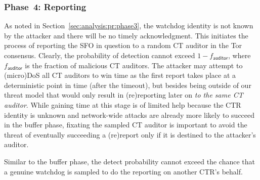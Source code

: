 \subsubsection{Phase~4: Reporting} \label{sec:analysis:pr:phase4}
As noted in Section~\ref{sec:analysis:pr:phase3}, the watchdog identity is not
known by the attacker and there will be no timely acknowledgment.  This
initiates the process of reporting the SFO in question to a random CT auditor in
the Tor consensus.  Clearly, the probability of detection cannot exceed
$1-f_{\mathsf{auditor}}$, where $f_{\mathsf{auditor}}$ is the fraction of
malicious CT auditors.  The attacker may attempt to (micro)DoS all CT auditors
to win time as the first report takes place at a deterministic point in time
(after the timeout), but besides being outside of our threat model that would
only result in (re)reporting later on \emph{to the same CT auditor}.
While gaining time at this stage is of limited help because the CTR identity is
unknown and network-wide attacks are already more likely to succeed in the
buffer phase, fixating the sampled CT auditor is important to avoid the threat
of eventually succeeding a (re)report only if it is destined to the attacker's
auditor.

Similar to the buffer phase, the detect probability cannot exceed the chance
that a genuine watchdog is sampled to do the reporting on another CTR's behalf.
